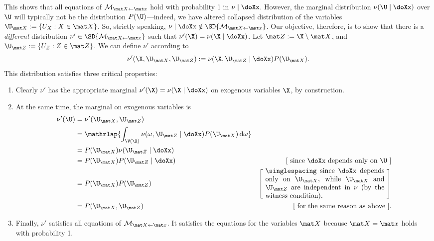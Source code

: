 \begin{subappendices}
\begin{lproof}
    This shows that all equations of $\mathcal M_{\mat X {\gets}\mat x}$ hold with probability 1 in $\nu \mid \doXx$. However, the marginal distribution $\nu(\U \mid \doXx)$ over $\U$ will typically not be the distribution $P(\U)$---indeed, we have altered collapsed distribution of the variables $\U_{\mat X} := \{ U_X : X \in \mat X\}$. 
    So, strictly speaking, $\nu \mid \doXx \notin \SD{\mathcal M_{\mat X {\gets}\mat x}}$.
    Our objective, therefore, is to show that there is a \emph{different}  distribution $\nu' \in \SD{\mathcal M_{\mat X {\gets} \mat x}}$ such that $\nu'(\X) = \nu(\X \mid \doXx)$. 
    Let $\mat Z := \X \setminus \mat X$, and $\U_{\mat Z} := \{ U_Z : Z \in \mat Z\}$. 
    We can define $\nu'$ according to
    \[
        \nu'(\X, \U_{\mat X}, \U_{\mat Z}) := 
            \nu(\X, \U_{\mat Z} \mid \doXx) P(\U_{\mat X}).
    \]
    This distribution satisfies 
    three critical properties:
    \begin{enumerate}
        \item Clearly $\nu'$ has the appropriate marginal $\nu'(\X) = \nu(\X \mid \doXx)$ on exogenous variables $\X$, by construction.
        \item At the same time, the marginal on exogenous variables is
        \begin{align*}
            \nu'(\U) &= \nu'(\U_{\mat X}, \U_{\mat Z})  \\
            &= 
                \mathrlap{
                \int_{\V(\X)} \nu(\omega, \U_{\mat Z}\mid \doXx) P(\U_{\mat X}) \,\mathrm d\omega
                }
                \\
            &= P(\U_{\mat X}) \nu(\U_{\mat Z} \mid \doXx) 
                &\text{}\\
            &= P(\U_{\mat X}) P(\U_{\mat Z} \mid \doXx) 
                &\text{[ since $\doXx$ depends only on $\U$ ]}
                \\
            &= P(\U_{\mat X}) P(\U_{\mat Z}) 
                &\left[~\parbox{6cm}{\singlespacing since $\doXx$ depends only on $\U_{\mat X}$, while $\U_{\mat X}$ and $\U_{\mat Z}$ are independent in $\nu$ (by the witness condition).}~\right]
                \\
            &= P(\U_{\mat X}, \U_{\mat Z})
                & [\text{ for the same reason as above }].
        \end{align*}
        \item Finally, $\nu'$ satisfies all equations of $\mathcal M_{\mat X{\gets} \mat x}$. It satisfies the equations for the variables $\mat X$ because $\mat X = \mat x$ holds with probability 1. 

\end{enumerate}
\end{lproof}
\end{subappendices}
